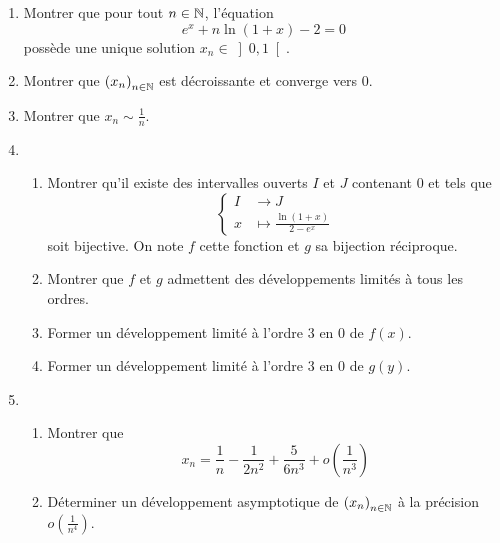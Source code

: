 \begin{enumerate}
  \item Montrer que pour tout $n\in \mathbb{N}$, l'équation
\begin{displaymath}
  e^x + n \ln(1+x) -2 = 0
\end{displaymath}
possède une unique solution $x_n \in \left] 0,1\right[$.
  \item Montrer que $\left( x_n\right)_{n\in \mathbb{N}}$ est décroissante et converge vers $0$.
  \item Montrer que $x_n \sim \frac{1}{n}$.
  \item 
\begin{enumerate}
  \item   Montrer qu'il existe des intervalles ouverts $I$ et $J$ contenant $0$ et tels que
\begin{displaymath}
  \left\lbrace 
  \begin{aligned}
    I &\rightarrow J \\ x&\mapsto \frac{\ln(1+x)}{2-e^{x}}
  \end{aligned}
\right. 
\end{displaymath}
soit bijective. On note $f$ cette fonction et $g$ sa bijection réciproque. 
  \item Montrer que $f$ et $g$ admettent des développements limités à tous les ordres.
  \item Former un développement limité à l'ordre $3$ en $0$ de $f(x)$.
  \item Former un développement limité à l'ordre $3$ en $0$ de $g(y)$.
\end{enumerate}

\item 
\begin{enumerate}
  \item Montrer que
\begin{displaymath}
  x_n = \frac{1}{n} - \frac{1}{2n^2} + \frac{5}{6n^3} + o(\frac{1}{n^3})
\end{displaymath}
  \item Déterminer un développement asymptotique de $\left( x_n\right)_{n\in \mathbb{N}}$ à la précision $o(\frac{1}{n^4})$.
\end{enumerate}

\end{enumerate}
